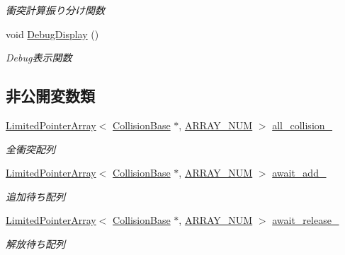 \begin{DoxyCompactItemize}
\begin{DoxyCompactList}\small\item\em 衝突計算振り分け関数 \end{DoxyCompactList}\item 
void \mbox{\hyperlink{class_collision_manager_a4da1241f3905c3855b31d7e20ceed5a1}{Debug\+Display}} ()
\begin{DoxyCompactList}\small\item\em Debug表示関数 \end{DoxyCompactList}\end{DoxyCompactItemize}
\subsection*{非公開変数類}
\begin{DoxyCompactItemize}
\item 
\mbox{\hyperlink{class_limited_pointer_array}{Limited\+Pointer\+Array}}$<$ \mbox{\hyperlink{class_collision_base}{Collision\+Base}} $\ast$, \mbox{\hyperlink{class_collision_manager_addbc64e1fa0b01f3be07c897887f44ec}{A\+R\+R\+A\+Y\+\_\+\+N\+UM}} $>$ \mbox{\hyperlink{class_collision_manager_a1be7aa8904688724543897d58b22a406}{all\+\_\+collision\+\_\+}}
\begin{DoxyCompactList}\small\item\em 全衝突配列 \end{DoxyCompactList}\item 
\mbox{\hyperlink{class_limited_pointer_array}{Limited\+Pointer\+Array}}$<$ \mbox{\hyperlink{class_collision_base}{Collision\+Base}} $\ast$, \mbox{\hyperlink{class_collision_manager_addbc64e1fa0b01f3be07c897887f44ec}{A\+R\+R\+A\+Y\+\_\+\+N\+UM}} $>$ \mbox{\hyperlink{class_collision_manager_aca55a8f7b3f67f58b5455cf1ac17fc8b}{await\+\_\+add\+\_\+}}
\begin{DoxyCompactList}\small\item\em 追加待ち配列 \end{DoxyCompactList}\item 
\mbox{\hyperlink{class_limited_pointer_array}{Limited\+Pointer\+Array}}$<$ \mbox{\hyperlink{class_collision_base}{Collision\+Base}} $\ast$, \mbox{\hyperlink{class_collision_manager_addbc64e1fa0b01f3be07c897887f44ec}{A\+R\+R\+A\+Y\+\_\+\+N\+UM}} $>$ \mbox{\hyperlink{class_collision_manager_a077c3b33557c56afef69c69698fc76e0}{await\+\_\+release\+\_\+}}
\begin{DoxyCompactList}\small\item\em 解放待ち配列 \end{DoxyCompactList}\item 

\end{DoxyCompactItemize}
